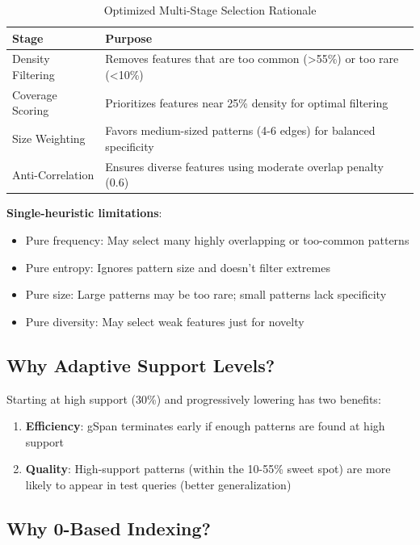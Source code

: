 \documentclass[12pt,a4paper]{article}
\begin{document}
\begin{table}[H]
\centering
\begin{tabular}{lp{8cm}}
\toprule
\textbf{Stage} & \textbf{Purpose} \\
\midrule
Density Filtering & Removes features that are too common (>55\%) or too rare (<10\%) \\
Coverage Scoring & Prioritizes features near 25\% density for optimal filtering \\
Size Weighting & Favors medium-sized patterns (4-6 edges) for balanced specificity \\
Anti-Correlation & Ensures diverse features using moderate overlap penalty (0.6) \\
\bottomrule
\end{tabular}
\caption{Optimized Multi-Stage Selection Rationale}
\end{table}

\textbf{Single-heuristic limitations}:
\begin{itemize}
    \item Pure frequency: May select many highly overlapping or too-common patterns
    \item Pure entropy: Ignores pattern size and doesn't filter extremes
    \item Pure size: Large patterns may be too rare; small patterns lack specificity
    \item Pure diversity: May select weak features just for novelty
\end{itemize}

\subsection{Why Adaptive Support Levels?}

Starting at high support (30\%) and progressively lowering has two benefits:

\begin{enumerate}
    \item \textbf{Efficiency}: gSpan terminates early if enough patterns are found at high support
    \item \textbf{Quality}: High-support patterns (within the 10-55\% sweet spot) are more likely to appear in test queries (better generalization)
\end{enumerate}

\subsection{Why 0-Based Indexing?}
\end{document}
